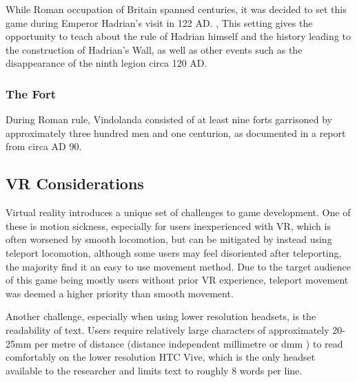 \documentclass[sigconf,authordraft]{acmart}
\begin{document}
While Roman occupation of Britain spanned centuries, it was decided to set this
game during Emperor Hadrian's visit in 122 AD.
\cite[p.176]{danziger_hadrians_2006}, \cite[p.157]{moffat_wall_2009}
This setting gives the opportunity to teach about the rule of Hadrian himself
and the history leading to the construction of Hadrian's Wall, as well as other
events such as the disappearance of the ninth legion circa 120 AD.


\subsubsection{The Fort}

During Roman rule, Vindolanda consisted of at least nine forts
\cite{birley_vindolanda_2009} garrisoned by approximately three hundred men and
one centurion, as documented in a report from circa AD 90.
\cite{bowman_military_1991}

\subsection{VR Considerations}
Virtual reality introduces a unique set of challenges to game development. One
of these is motion sickness, especially for users inexperienced with VR,
\cite{chattha_motion_2020} which is often worsened by smooth locomotion, but can
be mitigated by instead using teleport locomotion, although some users may feel
disoriented after teleporting, the majority find it an easy to use movement
method. \cite{bozgeyikli_point_2016} Due to the target audience of this game
being mostly users without prior VR experience, teleport movement was deemed a
higher priority than smooth movement.

\label{sec:text_scale}
Another challenge, especially when using lower resolution headsets, is the
readability of text. Users require relatively large characters of approximately
20-25mm per metre of distance (distance independent millimetre or dmm
\cite{google_for_developers_designing_2017}) to read comfortably on the lower
resolution HTC Vive, \cite{solum_readability_2019} which is the only headset
available to the researcher and limits text to roughly 8 words per line.

\end{document}
